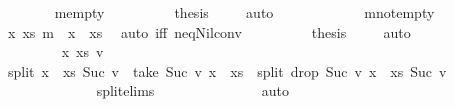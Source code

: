 \begin{isabellebody}
\ \ \ \ \ \ \isamarkupfalse%
\ m{\isacharunderscore}{\kern0pt}empty\isanewline
\ \ \ \ \ \ \isamarkupfalse%
\ \isamarkupfalse%
\ {\isacharquery}{\kern0pt}thesis\ \isamarkupfalse%
\ {}\ \isamarkupfalse%
\ auto\isanewline
\ \ \ \ \isamarkupfalse%
\isanewline
\ \ \ \ \ \ \isamarkupfalse%
\ m{\isacharunderscore}{\kern0pt}not{\isacharunderscore}{\kern0pt}empty\isanewline
\ \ \ \ \ \ \isamarkupfalse%
\ \isamarkupfalse%
\ {\isachardoublequoteopen}{\isasymexists}x\ xs{\isachardot}{\kern0pt}\ m\ {\isacharequal}{\kern0pt}\ x\ {\isacharhash}{\kern0pt}\ xs{\isachardoublequoteclose}\ \isamarkupfalse%
\ {\isacharparenleft}{\kern0pt}auto\ iff{\isacharcolon}{\kern0pt}\ neq{\isacharunderscore}{\kern0pt}Nil{\isacharunderscore}{\kern0pt}conv{\isacharparenright}{\kern0pt}\isanewline
\ \ \ \ \ \ \isamarkupfalse%
\ \isamarkupfalse%
\ {\isacharquery}{\kern0pt}thesis\ \isamarkupfalse%
\ {}\ \isamarkupfalse%
\ {\isacharparenleft}{\kern0pt}auto{\isacharparenright}{\kern0pt}\isanewline
\ \ \ \ \isamarkupfalse%
\isanewline
\ \ \ \ \isamarkupfalse%
\isanewline
\ \ \ \ \ \ \isamarkupfalse%
\ {\isacharparenleft}{\kern0pt}{}\ x\ xs\ v{\isacharparenright}{\kern0pt}\isanewline
\ \ \ \ \ \ \isamarkupfalse%
\ {\isachardoublequoteopen}split\ {\isacharparenleft}{\kern0pt}x\ {\isacharhash}{\kern0pt}\ xs{\isacharparenright}{\kern0pt}\ {\isacharparenleft}{\kern0pt}Suc\ v{\isacharparenright}{\kern0pt}\ {\isacharequal}{\kern0pt}\ {\isacharparenleft}{\kern0pt}take\ {\isacharparenleft}{\kern0pt}Suc\ v{\isacharparenright}{\kern0pt}\ {\isacharparenleft}{\kern0pt}x\ {\isacharhash}{\kern0pt}\ xs{\isacharparenright}{\kern0pt}{\isacharparenright}{\kern0pt}\ {\isacharhash}{\kern0pt}\ {\isacharparenleft}{\kern0pt}split\ {\isacharparenleft}{\kern0pt}drop\ {\isacharparenleft}{\kern0pt}Suc\ v{\isacharparenright}{\kern0pt}\ {\isacharparenleft}{\kern0pt}x\ {\isacharhash}{\kern0pt}\ xs{\isacharparenright}{\kern0pt}{\isacharparenright}{\kern0pt}\ {\isacharparenleft}{\kern0pt}Suc\ v{\isacharparenright}{\kern0pt}{\isacharparenright}{\kern0pt}{\isachardoublequoteclose}\isanewline
\ \ \ \ \ \ \ \ \ \ \ \ \isamarkupfalse%
\ split{\isachardot}{\kern0pt}elims\ \isanewline
\ \ \ \ \ \ \ \ \ \ \ \ \isamarkupfalse%
\ auto\isanewline
\ \ \ \ \ \ \isamarkupfalse%

\end{isabellebody}
